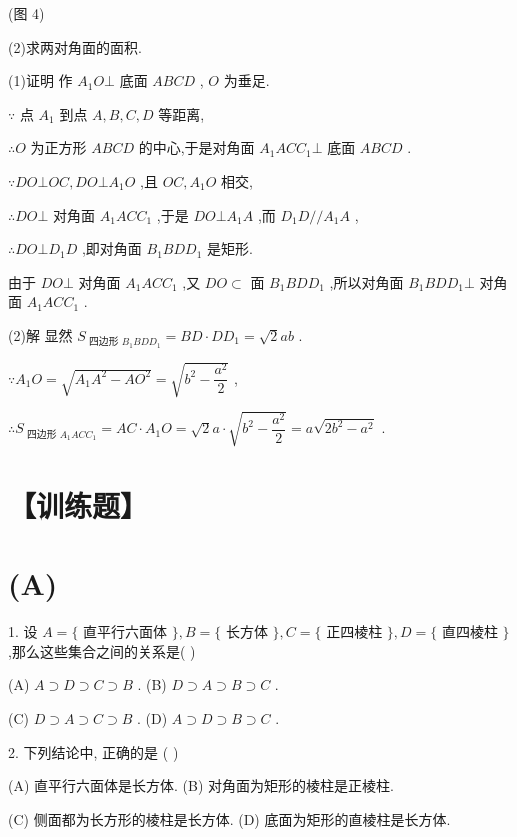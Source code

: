 (图 4)

(2)求两对角面的面积.

(1)证明 作 ${A}_{1}O \bot$ 底面 ${ABCD}$ , $O$ 为垂足.

$\because$ 点 ${A}_{1}$ 到点 $A,B,C,D$ 等距离,

$\therefore O$ 为正方形 ${ABCD}$ 的中心,于是对角面 ${A}_{1}{AC}{C}_{1} \bot$ 底面 ${ABCD}$ .

$\because {DO} \bot  {OC},{DO} \bot  {A}_{1}O$ ,且 ${OC},{A}_{1}O$ 相交,

$\therefore {DO} \bot$ 对角面 ${A}_{1}{AC}{C}_{1}$ ,于是 ${DO} \bot  {A}_{1}A$ ,而 ${D}_{1}D//{A}_{1}A$ ,

$\therefore {DO} \bot  {D}_{1}D$ ,即对角面 ${B}_{1}{BD}{D}_{1}$ 是矩形.

由于 ${DO} \bot$ 对角面 ${A}_{1}{AC}{C}_{1}$ ,又 ${DO} \subset$ 面 ${B}_{1}{BD}{D}_{1}$ ,所以对角面 ${B}_{1}{BD}{D}_{1} \bot$ 对角面 ${A}_{1}{AC}{C}_{1}$ .

(2)解 显然 ${S}_{\text{ 四边形 }{B}_{1}{BD}{D}_{1}} = {BD} \cdot  D{D}_{1} = \sqrt{2}{ab}$ .

$\because {A}_{1}O = \sqrt{{A}_{1}{A}^{2} - A{O}^{2}} = \sqrt{{b}^{2} - \dfrac{{a}^{2}}{2}}$ ,

$\therefore {S}_{\text{ 四边形 }{A}_{1}{AC}{C}_{1}} = {AC} \cdot  {A}_{1}O = \sqrt{2}a \cdot  \sqrt{{b}^{2} - \dfrac{{a}^{2}}{2}} = a\sqrt{2{b}^{2} - {a}^{2}}$ .

\section*{【训练题】}

\section*{(A)}

1. 设 $A = \{$ 直平行六面体 $\} ,B = \{$ 长方体 $\} ,C = \{$ 正四棱柱 $\} ,D = \{$ 直四棱柱 $\}$ ,那么这些集合之间的关系是(   )

(A) $A \supset  D \supset  C \supset  B$ . (B) $D \supset  A \supset  B \supset  C$ .

(C) $D \supset  A \supset  C \supset  B$ . (D) $A \supset  D \supset  B \supset  C$ .

2. 下列结论中, 正确的是 (   )

(A) 直平行六面体是长方体. (B) 对角面为矩形的棱柱是正棱柱.

(C) 侧面都为长方形的棱柱是长方体. (D) 底面为矩形的直棱柱是长方体.

